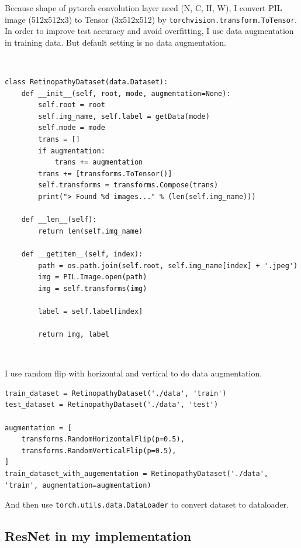 \documentclass[12pt]{article}
\begin{document}
Because shape of pytorch convolution layer need (N, C, H, W), I convert PIL image (512x512x3) to Tensor (3x512x512) by \verb|torchvision.transform.ToTensor|. In order to improve test accuracy and avoid overfitting, I use data augmentation in training data. But default setting is no data augmentation.
\par \ \par
\begin{verbatim}
class RetinopathyDataset(data.Dataset):
    def __init__(self, root, mode, augmentation=None):
        self.root = root
        self.img_name, self.label = getData(mode)
        self.mode = mode
        trans = []
        if augmentation:
            trans += augmentation
        trans += [transforms.ToTensor()]
        self.transforms = transforms.Compose(trans)
        print("> Found %d images..." % (len(self.img_name)))

    def __len__(self):
        return len(self.img_name)

    def __getitem__(self, index):
        path = os.path.join(self.root, self.img_name[index] + '.jpeg')
        img = PIL.Image.open(path)
        img = self.transforms(img)
        
        label = self.label[index]
        
        return img, label
\end{verbatim}
\par \ \par
I use random flip with horizontal and vertical to do data augmentation.

\begin{verbatim}
train_dataset = RetinopathyDataset('./data', 'train')
test_dataset = RetinopathyDataset('./data', 'test')

augmentation = [
    transforms.RandomHorizontalFlip(p=0.5),
    transforms.RandomVerticalFlip(p=0.5),
]
train_dataset_with_augementation = RetinopathyDataset('./data', 'train', augmentation=augmentation)
\end{verbatim}

And then use \verb|torch.utils.data.DataLoader| to convert dataset to dataloader.

\subsection{ResNet in my implementation}
\end{document}
